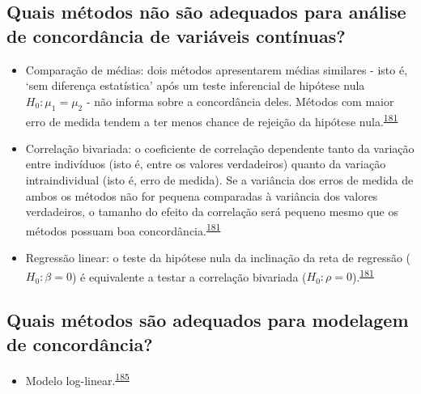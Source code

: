 \documentclass[
  a4paper,
]{book}
\providecommand{\tightlist}{%
  \setlength{\itemsep}{0pt}\setlength{\parskip}{0pt}}
\begin{document}
\hypertarget{quais-muxe9todos-nuxe3o-suxe3o-adequados-para-anuxe1lise-de-concorduxe2ncia-de-variuxe1veis-contuxednuas}{%
\subsection{Quais métodos não são adequados para análise de concordância de variáveis contínuas?}\label{quais-muxe9todos-nuxe3o-suxe3o-adequados-para-anuxe1lise-de-concorduxe2ncia-de-variuxe1veis-contuxednuas}}

\begin{itemize}
\item
  Comparação de médias: dois métodos apresentarem médias similares - isto é, `sem diferença estatística' após um teste inferencial de hipótese nula \(H_{0}:\mu_{1} = \mu_{2}\) - não informa sobre a concordância deles. Métodos com maior erro de medida tendem a ter menos chance de rejeição da hipótese nula.\textsuperscript{\protect\hyperlink{ref-altman1983}{181}}
\item
  Correlação bivariada: o coeficiente de correlação dependente tanto da variação entre indivíduos (isto é, entre os valores verdadeiros) quanto da variação intraindividual (isto é, erro de medida). Se a variância dos erros de medida de ambos os métodos não for pequena comparadas à variância dos valores verdadeiros, o tamanho do efeito da correlação será pequeno mesmo que os métodos possuam boa concordância.\textsuperscript{\protect\hyperlink{ref-altman1983}{181}}
\item
  Regressão linear: o teste da hipótese nula da inclinação da reta de regressão (\(H_{0}:\beta = 0\)) é equivalente a testar a correlação bivariada (\(H_{0}:\rho = 0\)).\textsuperscript{\protect\hyperlink{ref-altman1983}{181}}
\end{itemize}

\hypertarget{quais-muxe9todos-suxe3o-adequados-para-modelagem-de-concorduxe2ncia}{%
\subsection{Quais métodos são adequados para modelagem de concordância?}\label{quais-muxe9todos-suxe3o-adequados-para-modelagem-de-concorduxe2ncia}}

\begin{itemize}
\tightlist
\item
  Modelo log-linear.\textsuperscript{\protect\hyperlink{ref-banerjee1999}{185}}
\end{itemize}
\end{document}
